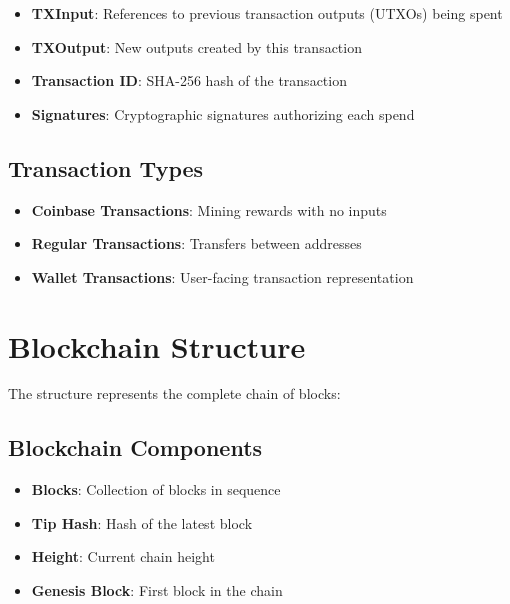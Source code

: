 \begin{itemize}
  \item \textbf{TXInput}: References to previous transaction outputs (UTXOs) being spent
  \item \textbf{TXOutput}: New outputs created by this transaction
  \item \textbf{Transaction ID}: SHA-256 hash of the transaction
  \item \textbf{Signatures}: Cryptographic signatures authorizing each spend
\end{itemize}

\subsection{Transaction Types}
\label{sec:ch06-transaction-types}

\begin{itemize}
  \item \textbf{Coinbase Transactions}: Mining rewards with no inputs
  \item \textbf{Regular Transactions}: Transfers between addresses
  \item \textbf{Wallet Transactions}: User-facing transaction representation
\end{itemize}

\section{Blockchain Structure}
\label{sec:ch06-blockchain-structure}

The  structure represents the complete chain of blocks:

\subsection{Blockchain Components}
\label{sec:ch06-blockchain-components}

\begin{itemize}
  \item \textbf{Blocks}: Collection of blocks in sequence
  \item \textbf{Tip Hash}: Hash of the latest block
  \item \textbf{Height}: Current chain height
  \item \textbf{Genesis Block}: First block in the chain
\end{itemize}

